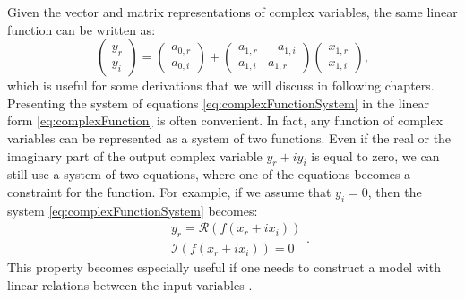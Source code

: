 \documentclass[
]{book}
\begin{document}
Given the vector and matrix representations of complex variables, the same linear function can be written as:
\begin{equation*}
    \begin{pmatrix} y_r \\ y_i \end{pmatrix} = \begin{pmatrix} a_{0,r} \\ a_{0,i} \end{pmatrix} + \begin{pmatrix} a_{1,r} & -a_{1,i} \\ a_{1,i} & a_{1,r} \end{pmatrix} \begin{pmatrix} x_{1,r} \\ x_{1,i} \end{pmatrix} ,
\end{equation*}
which is useful for some derivations that we will discuss in following chapters. Presenting the system of equations \eqref{eq:complexFunctionSystem} in the linear form \eqref{eq:complexFunction} is often convenient. In fact, any function of complex variables can be represented as a system of two functions. Even if the real or the imaginary part of the output complex variable \(y_r + i y_i\) is equal to zero, we can still use a system of two equations, where one of the equations becomes a constraint for the function. For example, if we assume that \(y_i=0\), then the system \eqref{eq:complexFunctionSystem} becomes:
\begin{equation*}
    \begin{aligned}
        & y_r = \mathcal{R}(f(x_r+ix_i)) \\
        & \mathcal{I}(f(x_r+ix_i)) = 0
    \end{aligned} .
\end{equation*}
This property becomes especially useful if one needs to construct a model with linear relations between the input variables \citep[this is discussed in Chapter 5 of][]{Svetunkov2012}.
\end{document}
